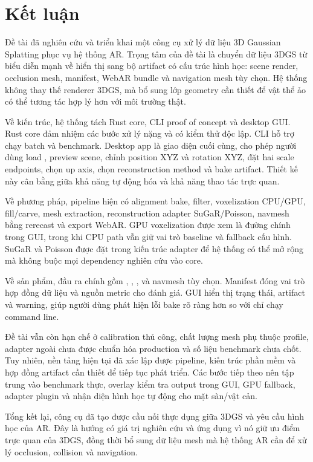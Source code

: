 \section{Kết luận}

Đề tài đã nghiên cứu và triển khai một công cụ xử lý dữ liệu 3D Gaussian Splatting phục vụ hệ thống AR. Trọng tâm của đề tài là chuyển dữ liệu 3DGS từ biểu diễn mạnh về hiển thị sang bộ artifact có cấu trúc hình học: scene render, occlusion mesh, manifest, WebAR bundle và navigation mesh tùy chọn. Hệ thống không thay thế renderer 3DGS, mà bổ sung lớp geometry cần thiết để vật thể ảo có thể tương tác hợp lý hơn với môi trường thật.

Về kiến trúc, hệ thống tách Rust core, CLI proof of concept và desktop GUI. Rust core đảm nhiệm các bước xử lý nặng và có kiểm thử độc lập. CLI hỗ trợ chạy batch và benchmark. Desktop app là giao diện cuối cùng, cho phép người dùng load , preview scene, chỉnh position XYZ và rotation XYZ, đặt hai scale endpoints, chọn up axis, chọn reconstruction method và bake artifact. Thiết kế này cân bằng giữa khả năng tự động hóa và khả năng thao tác trực quan.

Về phương pháp, pipeline hiện có alignment bake, filter, voxelization CPU/GPU, fill/carve, mesh extraction, reconstruction adapter SuGaR/Poisson, navmesh bằng rerecast và export WebAR. GPU voxelization được xem là đường chính trong GUI, trong khi CPU path vẫn giữ vai trò baseline và fallback cấu hình. SuGaR và Poisson được đặt trong kiến trúc adapter để hệ thống có thể mở rộng mà không buộc mọi dependency nghiên cứu vào core.

Về sản phẩm, đầu ra chính gồm , , ,  và navmesh tùy chọn. Manifest đóng vai trò hợp đồng dữ liệu và nguồn metric cho đánh giá. GUI hiển thị trạng thái, artifact và warning, giúp người dùng phát hiện lỗi bake rõ ràng hơn so với chỉ chạy command line.

Đề tài vẫn còn hạn chế ở calibration thủ công, chất lượng mesh phụ thuộc profile, adapter ngoài chưa được chuẩn hóa production và số liệu benchmark chưa chốt. Tuy nhiên, nền tảng hiện tại đã xác lập được pipeline, kiến trúc phần mềm và hợp đồng artifact cần thiết để tiếp tục phát triển. Các bước tiếp theo nên tập trung vào benchmark thực, overlay kiểm tra output trong GUI, GPU fallback, adapter plugin và nhận diện hình học tự động cho mặt sàn/vật cản.

Tổng kết lại, công cụ đã tạo được cầu nối thực dụng giữa 3DGS và yêu cầu hình học của AR. Đây là hướng có giá trị nghiên cứu và ứng dụng vì nó giữ ưu điểm trực quan của 3DGS, đồng thời bổ sung dữ liệu mesh mà hệ thống AR cần để xử lý occlusion, collision và navigation.
